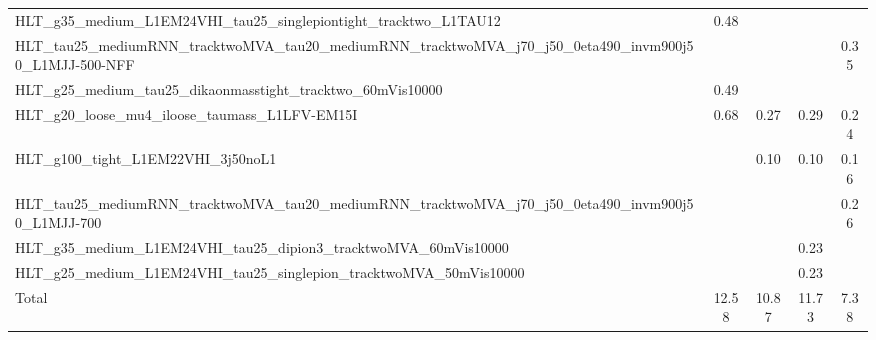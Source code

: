 \begin{table}[!ht]
{\begin{tabular}{p{20cm}cccc}
    HLT\_g35\_medium\_L1EM24VHI\_tau25\_singlepiontight\_tracktwo\_L1TAU12&
    0.48&
    &
    &
    \\
    HLT\_tau25\_mediumRNN\_tracktwoMVA\_tau20\_mediumRNN\_tracktwoMVA\_j70\_j50\_0eta490\_invm900j50\_L1MJJ-500-NFF&
    &
    &
    &
    0.35\\
    HLT\_g25\_medium\_tau25\_dikaonmasstight\_tracktwo\_60mVis10000&
    0.49&
    &
    &
    \\
    HLT\_g20\_loose\_mu4\_iloose\_taumass\_L1LFV-EM15I&
    0.68&
    0.27&
    0.29&
    0.24\\
    HLT\_g100\_tight\_L1EM22VHI\_3j50noL1&
    &
    0.10&
    0.10&
    0.16\\
    HLT\_tau25\_mediumRNN\_tracktwoMVA\_tau20\_mediumRNN\_tracktwoMVA\_j70\_j50\_0eta490\_invm900j50\_L1MJJ-700&
    &
    &
    &
    0.26\\
    HLT\_g35\_medium\_L1EM24VHI\_tau25\_dipion3\_tracktwoMVA\_60mVis10000&
    &
    &
    0.23\\
    HLT\_g25\_medium\_L1EM24VHI\_tau25\_singlepion\_tracktwoMVA\_50mVis10000&
    &
    &
    0.23\\
    \hline
    Total&
    12.58&
    10.87&
    11.73&
    7.38\\
    \hline
    \hline
    \end{tabular}
    }
    \end{table}
    